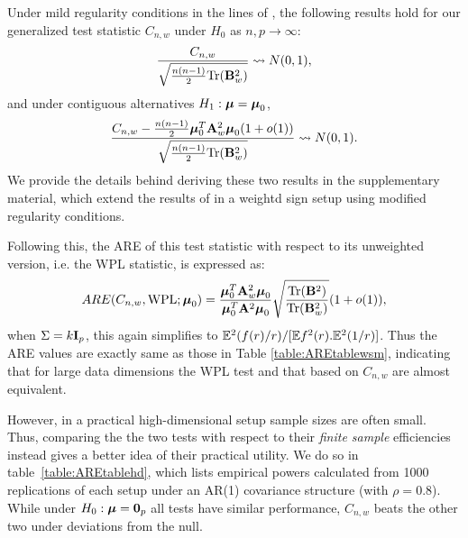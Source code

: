 Under mild regularity conditions in the lines of \cite{WangPengLi15}, the following results hold for our generalized test statistic $C_{n,w}$ under $H_0$ as $n,p \rightarrow \infty$:
%
\begin{equation}\label{eqn:hdtest1}
\frac{C_{n,w}}{\sqrt{\frac{n(n-1)}{2} \text{Tr}({\mathbf{B}}_w^2)}} \leadsto N(0,1),
\end{equation}
%
and under contiguous alternatives $H_1: {\boldsymbol{\mu}} = {\boldsymbol{\mu}}_0$,
%
\begin{equation}\label{eqn:hdtest2}
\frac{C_{n,w} - \frac{n(n-1)}{2} {\boldsymbol{\mu}}_0^T {\mathbf{A}}_w^2 {\boldsymbol{\mu}}_0 (1 + o(1)) }{\sqrt{\frac{n(n-1)}{2} \text{Tr}({\mathbf{B}}_w^2)}} \leadsto N(0,1).
\end{equation}
%
We provide the details behind deriving these two results in the supplementary material, which extend the results of \cite{WangPengLi15} in a weightd sign setup using modified regularity conditions.

Following this, the ARE of this test statistic with respect to its unweighted version, i.e. the WPL statistic, is expressed as:
%
$$
ARE(C_{n,w}, \text{WPL}; {\boldsymbol{\mu}}_0) = \frac{{\boldsymbol{\mu}}_0^T {\mathbf{A}}_w^2 {\boldsymbol{\mu}}_0}{{\boldsymbol{\mu}}_0^T {\mathbf{A}}^2 {\boldsymbol{\mu}}_0} \sqrt\frac{\text{Tr}({\mathbf{B}}^2)}{\text{Tr}({\mathbf{B}}_w^2)} (1 + o(1)),
$$
%
when $\Sigma = k {\mathbf{I}}_p$, this again simplifies to ${\mathbb{E}}^2(f(r)/r)/[{\mathbb{E}} f^2(r). {\mathbb{E}}^2(1/r)]$. Thus the ARE values are exactly same as those in Table \ref{table:AREtablewsm}, indicating that for large data dimensions the WPL test and that based on $C_{n,w}$ are almost equivalent.

However, in a practical high-dimensional setup sample sizes are often small. Thus, comparing the the two tests with respect to their \textit{finite sample} efficiencies instead gives a better idea of their practical utility. We do so in table~\ref{table:AREtablehd}, which lists empirical powers calculated from 1000 replications of each setup under an AR(1) covariance structure (with $\rho = 0.8$). While under $H_0: {\boldsymbol{\mu}} = {\bf 0}_p$ all tests have similar performance, $C_{n,w}$ beats the other two under deviations from the null.

